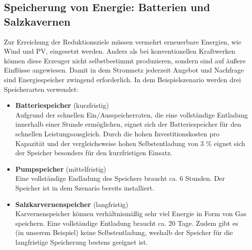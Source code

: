 \subsection{Speicherung von Energie: Batterien und Salzkavernen}

Zur Erreichung der Reduktionsziele müssen vermehrt erneuerbare Energien, wie Wind und PV, eingesetzt werden. Anders als bei konventionellen Kraftwerken können diese Erzeuger nicht selbstbestimmt produzieren, sondern sind auf äußere Einflüsse angewiesen. Damit in dem Stromnetz jederzeit Angebot und Nachfrage sind Energiespeicher zwingend erforderlich. In dem Beispielszenario werden drei Speicherarten verwendet:
\begin{itemize}
  \item \textbf{Batteriespeicher} (kurzfristig)\\Aufgrund der schnellen Ein/Ausspeicherraten, die eine vollständige Entladung innerhalb einer Stunde ermöglichen, eignet sich der Batteriespeicher für den schnellen Leistungsausgleich. Durch die hohen Investitionskosten pro Kapazität und der vergleichsweise hohen Selbstentladung von 3 \% eignet sich der Speicher besonders für den kurzfristigen Einsatz.
  \item \textbf{Pumpspeicher} (mittelfristig)\\Eine vollständige Endladung des Speichers braucht ca. 6 Stunden. Der Speicher ist in dem Szenario bereits installiert.
  \item \textbf{Salzkarvernenspeicher} (langfristig)\\Karvernenspeicher können verhältnismäßig sehr viel Energie in Form von Gas speichern. Eine vollständige Entladung braucht ca. 20 Tage. Zudem gibt es (in unserem Beispiel) keine Selbstentladung, weshalb der Speicher für die langfristige Speicherung bestens geeignet ist. 
\end{itemize}

